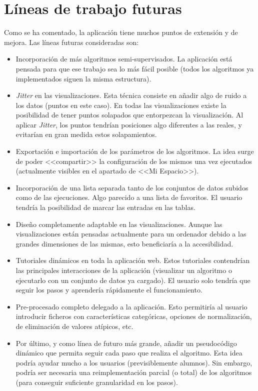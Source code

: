 \clearpage
\section{Líneas de trabajo futuras}

Como se ha comentado, la aplicación tiene muchos puntos de extensión y de
mejora. Las líneas futuras consideradas son:

\begin{itemize}
    \item Incorporación de más algoritmos semi-supervisados. La aplicación está
    pensada para que ese trabajo sea lo más fácil posible (todos los algoritmos
    ya implementados siguen la misma estructura).
    \item \textit{Jitter} en las visualizaciones. Esta técnica consiste en
    añadir algo de ruido a los datos (puntos en este caso). En todas las
    visualizaciones existe la posibilidad de tener puntos solapados que
    entorpezcan la visualización. Al aplicar \textit{Jitter}, los puntos
    tendrían posiciones algo diferentes a las reales, y evitarían en gran medida
    estos solapamientos.
    \item Exportación e importación de los parámetros de los algoritmos. La idea
    surge de poder <<compartir>> la configuración de los mismos una vez
    ejecutados (actualmente visibles en el apartado de <<Mi Espacio>>).
    \item Incorporación de una lista separada tanto de los conjuntos de datos
    subidos como de las ejecuciones. Algo parecido a una lista de favoritos. El
    usuario tendría la posibilidad de marcar las entradas en las tablas.
    \item Diseño completamente adaptable en las visualizaciones. Aunque las
    visualizaciones están pensadas actualmente para un ordenador debido a las
    grandes dimensiones de las mismas, esto beneficiaría a la accesibilidad.
    \item Tutoriales dinámicos en toda la aplicación web. Estos tutoriales
    contendrían las principales interacciones de la aplicación (visualizar un
    algoritmo o ejecutarlo con un conjunto de datos ya cargado). El usuario solo
    tendría que seguir los pasos y aprendería rápidamente el funcionamiento.
    \item Pre-procesado completo delegado a la aplicación. Esto permitiría al
    usuario introducir ficheros con características categóricas, opciones de
    normalización, de eliminación de valores atípicos, etc.
    \item Por último, y como línea de futuro más grande, añadir un pseudocódigo
    dinámico que permita seguir cada paso que realiza el algoritmo. Esta idea
    podría ayudar mucho a los usuarios (previsiblemente alumnos). Sin embargo,
    podría ser necesaria una reimplementación parcial (o total) de los
    algoritmos (para conseguir suficiente granularidad en los pasos).
\end{itemize}